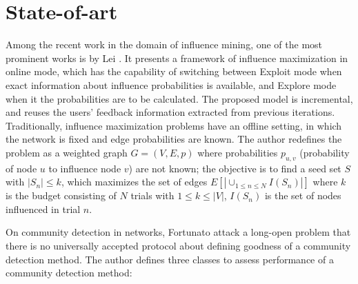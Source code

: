 	\section{State-of-art}
	\label{sec:related-work-state-of-art}
	Among the recent work in the domain of influence mining, one of the most prominent works is by Lei \cite{lei2015}. It presents a framework of influence maximization in online mode, which has the capability of switching between Exploit mode when exact information about influence probabilities is available, and Explore mode when it the probabilities are to be calculated. The proposed model is incremental, and reuses the users’ feedback information extracted from previous iterations. Traditionally, influence maximization problems have an offline setting, in which the network is fixed and edge probabilities are known. The author redefines the problem as a weighted graph $G=(V,E,p)$ where probabilities $p_{u,v}$ (probability of node $u$ to influence node $v$) are not known; the objective is to find a seed set $S$ with $|S_n|\leq k$, which maximizes the set of edges $E[|\cup_{1\leq n \leq N}I(S_n)|]$ where $k$ is the budget consisting of $N$ trials with $1\leq k\leq |V|$, $I(S_n)$ is the set of nodes influenced in trial $n$.
	
	On community detection in networks, Fortunato \cite{fortunato2016} attack a long-open problem that there is no universally accepted protocol about defining goodness of a community detection method. The author defines three classes to assess performance of a community detection method:
	
